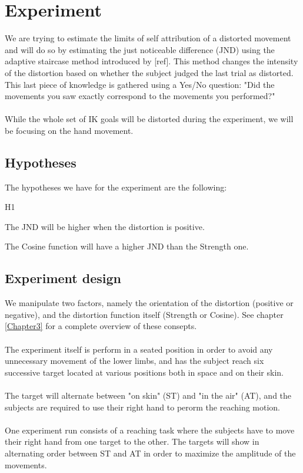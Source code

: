 
\chapter{Experiment} %

\label{Chapter4} %

We are trying to estimate the limits of self attribution of a distorted movement and will do so by estimating the just noticeable difference (JND) using the adaptive staircase method introduced by [ref]. This method changes the intensity of the distortion based on whether the subject judged the last trial as distorted. This last piece of knowledge is gathered using a Yes/No question: "Did the movements you saw exactly correspond to the movements you performed?"
\\\\
While the whole set of IK goals will be distorted during the experiment, we will be focusing on the hand movement.

\section{Hypotheses}

The hypotheses we have for the experiment are the following:

\begin{labeling}{H1}
  \item [H1] The JND will be higher when the distortion is positive.
  \item [H2] The Cosine function will have a higher JND than the Strength one.
\end{labeling}

\section{Experiment design}

We manipulate two factors, namely the orientation of the distortion (positive or negative), and the distortion function itself (Strength or Cosine). See chapter \ref{Chapter3} for a complete overview of these consepts.
\\\\
The experiment itself is perform in a seated position in order to avoid any unnecessary movement of the lower limbs, and has the subject reach six successive target located at various positions both in space and on their skin.
\\\\
The target will alternate between "on skin" (ST) and "in the air" (AT), and the subjects are required to use their right hand to perorm the reaching motion.
\\\\
One experiment run consists of a reaching task where the subjects have to move their right hand from one target to the other. The targets will show in alternating order between ST and AT in order to maximize the amplitude of the movements.

